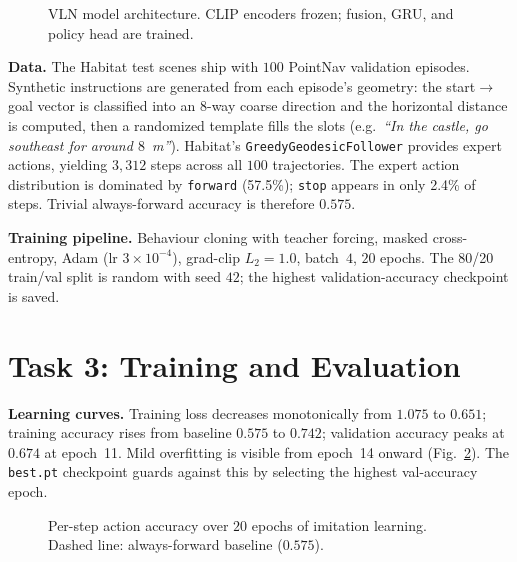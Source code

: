\documentclass[10pt, twocolumn]{article}
\begin{document}
\begin{figure}[ht]\centering
\caption{VLN model architecture. CLIP encoders frozen; fusion, GRU, and
policy head are trained.}
\label{fig:arch}
\end{figure}

\textbf{Data.} The Habitat test scenes ship with $100$ PointNav validation
episodes. Synthetic instructions are generated from each episode's
geometry: the start$\to$goal vector is classified into an $8$-way coarse
direction and the horizontal distance is computed, then a randomized
template fills the slots (e.g.\ \emph{``In the castle, go southeast for
around $8$~m''}). Habitat's \texttt{GreedyGeodesicFollower} provides expert
actions, yielding $3{,}312$ steps across all $100$ trajectories. The
expert action distribution is dominated by \texttt{forward} (57.5\%);
\texttt{stop} appears in only 2.4\% of steps. Trivial always-forward
accuracy is therefore $0.575$.

\textbf{Training pipeline.} Behaviour cloning with teacher forcing,
masked cross-entropy, Adam (lr $3\!\times\!10^{-4}$), grad-clip
$L_2\!=\!1.0$, batch~$4$, $20$ epochs. The 80/20 train/val split is
random with seed $42$; the highest validation-accuracy checkpoint is saved.

\section{Task 3: Training and Evaluation}\label{sec:task3}

\textbf{Learning curves.} Training loss decreases monotonically from
$1.075$ to $0.651$; training accuracy rises from baseline $0.575$ to
$0.742$; validation accuracy peaks at $\mathbf{0.674}$ at epoch~11.
Mild overfitting is visible from epoch~14 onward
(Fig.~\ref{fig:lc-acc}). The \texttt{best.pt} checkpoint guards against
this by selecting the highest val-accuracy epoch.

\begin{figure}[ht]\centering
\caption{Per-step action accuracy over $20$ epochs of imitation learning.
Dashed line: always-forward baseline ($0.575$).}
\label{fig:lc-acc}
\end{figure}
\end{document}
